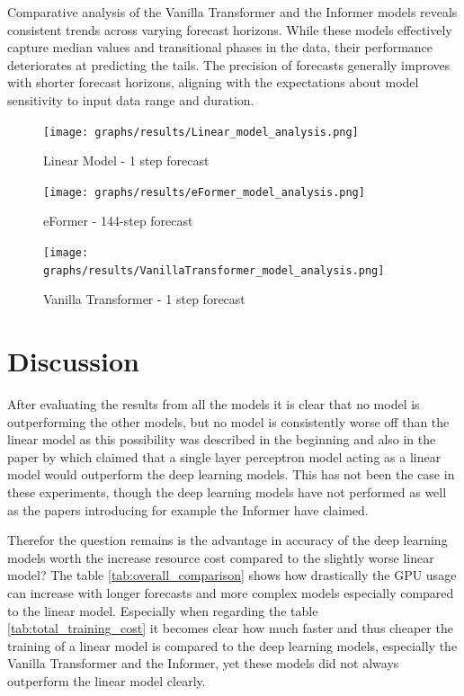 \documentclass{article}
\begin{document}
Comparative analysis of the Vanilla Transformer and the Informer models reveals consistent trends across varying forecast horizons. While these models effectively capture median values and transitional phases in the data, their performance deteriorates at predicting the tails. The precision of forecasts generally improves with shorter forecast horizons, aligning with the expectations about model sensitivity to input data range and duration.

\begin{figure}
    \centering
    \texttt{[image: graphs/results/Linear\_model\_analysis.png]}
    \caption{Linear Model - 1 step forecast}
    \label{fig:Linear_f1}
\end{figure}

\begin{figure}
    \centering
    \texttt{[image: graphs/results/eFormer\_model\_analysis.png]}
    \caption{eFormer - 144-step forecast}
    \label{fig:eFormer_f144_emb32}
\end{figure}

\begin{figure}
    \centering
    \texttt{[image: graphs/results/VanillaTransformer\_model\_analysis.png]}
    \caption{Vanilla Transformer - 1 step forecast}
    \label{fig:vanillatransformer_f1_emb64}
\end{figure}

\section{Discussion}

After evaluating the results from all the models it is clear that no model is outperforming the other models, but no model is consistently worse off than the linear model as this possibility was described in the beginning and also in the paper by \cite{transformers-effectiveness} which claimed that a single layer perceptron model acting as a linear model would outperform the deep learning models. This has not been the case in these experiments, though the deep learning models have not performed as well as the papers introducing for example the Informer have claimed.

Therefor the question remains is the advantage in accuracy of the deep learning models worth the increase resource cost compared to the slightly worse linear model? The table \ref{tab:overall_comparison} shows how drastically the GPU usage can increase with longer forecasts and more complex models especially compared to the linear model. Especially when regarding the table \ref{tab:total_training_cost} it becomes clear how much faster and thus cheaper the training of a linear model is compared to the deep learning models, especially the Vanilla Transformer and the Informer, yet these models did not always outperform the linear model clearly.
\end{document}
